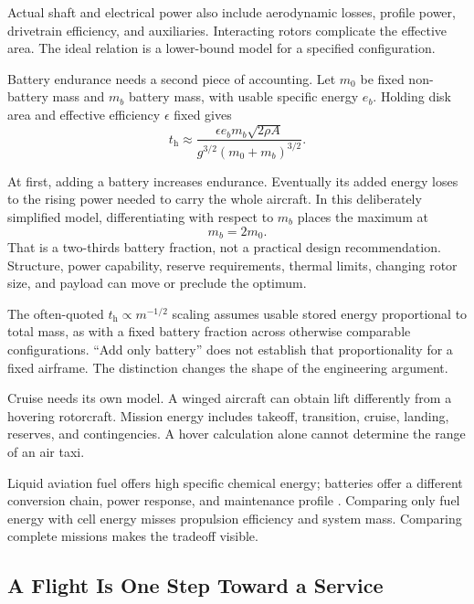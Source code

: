 Actual shaft and electrical power also include aerodynamic losses, profile power, drivetrain efficiency, and auxiliaries. Interacting rotors complicate the effective area. The ideal relation is a lower-bound model for a specified configuration.

Battery endurance needs a second piece of accounting. Let $m_0$ be fixed non-battery mass and $m_b$ battery mass, with usable specific energy $e_b$. Holding disk area and effective efficiency $\epsilon$ fixed gives
\begin{equation}
 t_{\mathrm h}\approx
 \frac{\epsilon e_b m_b\sqrt{2\rho A}}
      {g^{3/2}(m_0+m_b)^{3/2}}.
\end{equation}

At first, adding a battery increases endurance. Eventually its added energy loses to the rising power needed to carry the whole aircraft. In this deliberately simplified model, differentiating with respect to $m_b$ places the maximum at
\begin{equation}
 m_b=2m_0.
\end{equation}
That is a two-thirds battery fraction, not a practical design recommendation. Structure, power capability, reserve requirements, thermal limits, changing rotor size, and payload can move or preclude the optimum.

The often-quoted $t_{\mathrm h}\propto m^{-1/2}$ scaling assumes usable stored energy proportional to total mass, as with a fixed battery fraction across otherwise comparable configurations. “Add only battery” does not establish that proportionality for a fixed airframe. The distinction changes the shape of the engineering argument.

Cruise needs its own model. A winged aircraft can obtain lift differently from a hovering rotorcraft. Mission energy includes takeoff, transition, cruise, landing, reserves, and contingencies. A hover calculation alone cannot determine the range of an air taxi.

Liquid aviation fuel offers high specific chemical energy; batteries offer a different conversion chain, power response, and maintenance profile \cite{viswanathan2022challenges}. Comparing only fuel energy with cell energy misses propulsion efficiency and system mass. Comparing complete missions makes the tradeoff visible.

\subsection{A Flight Is One Step Toward a Service}

